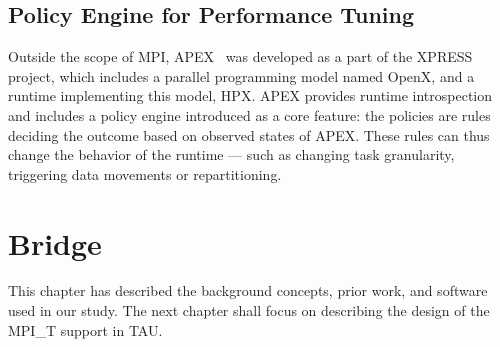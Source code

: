 \subsection{Policy Engine for Performance Tuning}

Outside the scope of MPI, APEX~\cite{Huck:2013:EPA:2491661.2481434} was developed as a part of the XPRESS project, which includes a parallel programming model named OpenX, and a runtime implementing this model, HPX. APEX provides runtime introspection and includes a policy engine introduced as a core feature: the policies are rules deciding the outcome based on observed states of APEX.
These rules can thus change the behavior of the runtime --- such as changing task granularity, triggering data movements or repartitioning.

\section{Bridge}
This chapter has described the background concepts, prior work, and software used in our study. The next chapter shall focus on describing the design of the MPI\_T support in TAU.
